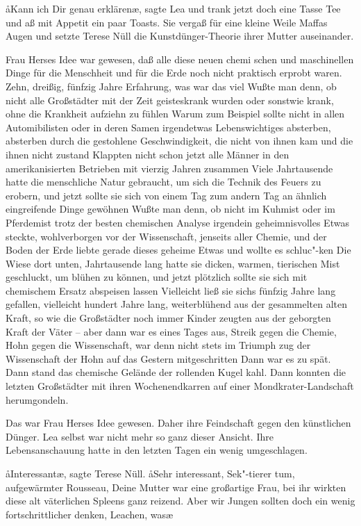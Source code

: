 \aa{}Kann ich Dir genau erklären\ae{}, sagte Lea und trank jetzt doch
eine Tasse Tee und aß mit Appetit ein paar Toasts. Sie
vergaß für eine kleine Weile Maffas Augen und setzte Terese
Nüll die Kunstdünger-Theorie ihrer Mutter auseinander.

Frau Herses Idee war gewesen, daß alle diese neuen chemi\-%
schen und maschinellen Dinge für die Menschheit und für die
Erde noch nicht praktisch erprobt waren. Zehn, dreißig, fünfzig
Jahre Erfahrung, was war das viel\frag{} Wußte man denn, ob
nicht alle Großstädter mit der Zeit geisteskrank wurden oder
sonstwie krank, ohne die Krankheit aufziehn zu fühlen\frag{}
Warum zum Beispiel sollte nicht in allen Automibilisten oder
in deren Samen irgendetwas Lebenswichtiges absterben,
absterben durch die gestohlene Geschwindigkeit, die nicht von
ihnen kam und die ihnen nicht zustand\frag{} Klappten nicht schon
jetzt alle Männer in den amerikanisierten Betrieben mit
vierzig Jahren zusammen\frag{} Viele Jahrtausende hatte die
menschliche Natur gebraucht, um sich die Technik des Feuers
zu erobern, und jetzt sollte sie sich von einem Tag zum andern
Tag an ähnlich eingreifende Dinge gewöhnen\frag{} Wußte man
denn, ob nicht im Kuhmist oder im Pferdemist trotz der besten
chemischen Analyse irgendein geheimnisvolles Etwas steckte,
wohlverborgen vor der Wissenschaft, jenseits aller Chemie,
und der Boden der Erde liebte gerade dieses geheime Etwas
und wollte es schluc"-ken\frag{} Die Wiese dort unten, Jahrtausende
lang hatte sie dicken, warmen, tierischen Mist geschluckt, um
blühen zu können, und jetzt plötzlich sollte sie sich mit chemischem
Ersatz abspeisen lassen\frag{} Vielleicht ließ sie sichs fünfzig Jahre
lang gefallen, vielleicht hundert Jahre lang, weiterblühend
aus der gesammelten alten Kraft, so wie die Großstädter noch
immer Kinder zeugten aus der geborgten Kraft der Väter --
aber dann war es eines Tages aus, Streik gegen die Chemie,
Hohn gegen die Wissenschaft, war denn nicht stets im Triumph\-%
zug der Wissenschaft der Hohn auf das Gestern mitgeschritten\frag{}
Dann war es zu spät. Dann stand das chemische Gelände der
rollenden Kugel kahl. Dann konnten die letzten Großstädter
mit ihren Wochenendkarren auf einer Mondkrater-Landschaft
herumgondeln.

Das war Frau Herses Idee gewesen. Daher ihre Feindschaft
gegen den künstlichen Dünger. Lea selbst war nicht mehr so
ganz dieser Ansicht. Ihre Lebensanschauung hatte in den
letzten Tagen ein wenig umgeschlagen.

\aa{}Interessant\ae{}, sagte Terese Nüll. \aa{}Sehr interessant, Sek"-tierer\-%
tum, aufgewärmter Rousseau, Deine
Mutter war eine großartige Frau, bei ihr wirkten diese alt\-%
väterlichen Spleens ganz reizend. Aber wir Jungen sollten
doch ein wenig fortschrittlicher denken, Leachen, was\frag{}\ae{}


